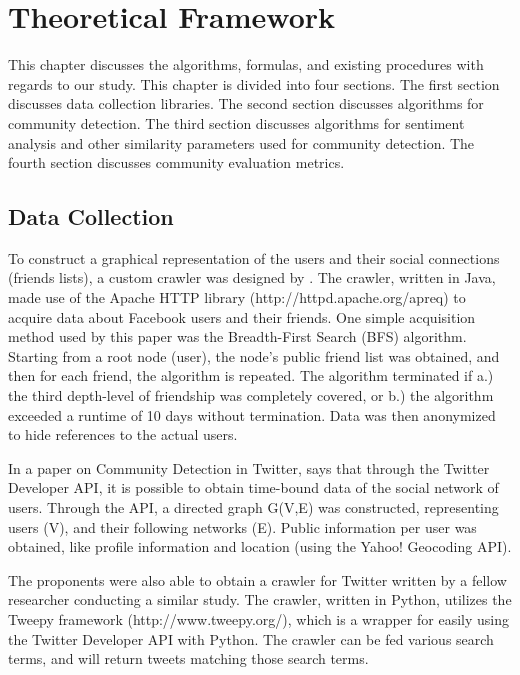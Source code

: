 %
%
%                 

\chapter{Theoretical Framework}
\label{sec:theoframe}

This chapter discusses the algorithms, formulas, and existing procedures with regards to our study. This chapter is divided into four sections. The first section discusses data collection libraries. The second section discusses algorithms for community detection. The third section discusses algorithms for sentiment analysis and other similarity parameters used for community detection. The fourth section discusses community evaluation metrics.

\section{Data Collection}

To construct a graphical representation of the users and their social connections (friends lists), a custom crawler was designed by . The crawler, written in Java, made use of the Apache HTTP library (http://httpd.apache.org/apreq) to acquire data about Facebook users and their friends. One simple acquisition method used by this paper was the Breadth-First Search (BFS) algorithm. Starting from a root node (user), the node’s public friend list was obtained, and then for each friend, the algorithm is repeated. The algorithm terminated if a.) the third depth-level of friendship was completely covered, or b.) the algorithm exceeded a runtime of 10 days without termination. Data was then anonymized to hide references to the actual users.

In a paper on Community Detection in Twitter,  says that through the Twitter Developer API, it is possible to obtain time-bound data of the social network of users. Through the API, a directed graph G(V,E) was constructed, representing users (V), and their following networks (E). Public information per user was obtained, like profile information and location (using the Yahoo! Geocoding API).

The proponents were also able to obtain a crawler for Twitter written by a fellow researcher conducting a similar study. The crawler, written in Python, utilizes the Tweepy framework (http://www.tweepy.org/), which is a wrapper for easily using the Twitter Developer API with Python. The crawler can be fed various search terms, and will return tweets matching those search terms.


